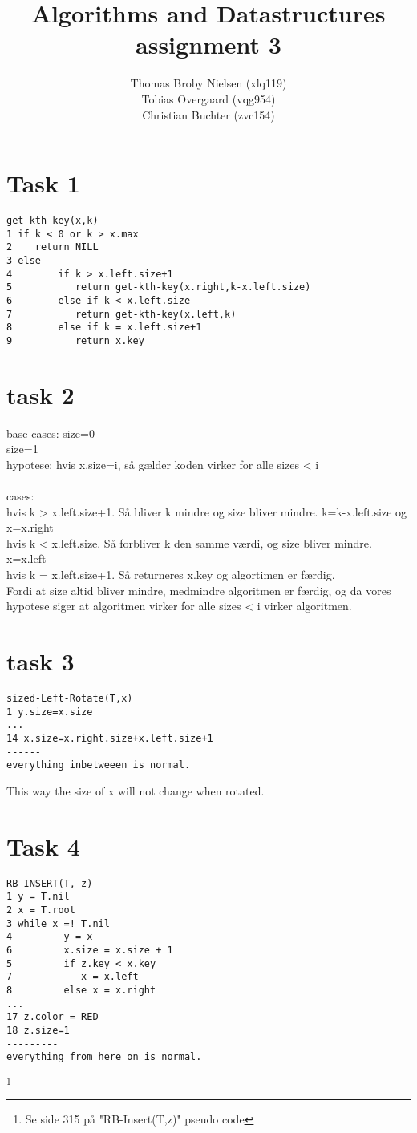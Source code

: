\documentclass[12pt]{article}
\title{Algorithms and Datastructures assignment 3}
\author{Thomas Broby Nielsen (xlq119)\\ Tobias Overgaard (vqg954)\\ Christian Buchter (zvc154)}
\begin{document}
\maketitle

\tableofcontents

\pagebreak
\section*{Task 1}
\begin{verbatim}
get-kth-key(x,k)
1 if k < 0 or k > x.max
2    return NILL
3 else
4        if k > x.left.size+1
5           return get-kth-key(x.right,k-x.left.size)
6        else if k < x.left.size
7           return get-kth-key(x.left,k)
8        else if k = x.left.size+1
9           return x.key
\end{verbatim}

\newpage
\section*{task 2}
base cases:
size=0\\
size=1\\
hypotese: hvis x.size=i, så gælder koden virker for alle sizes < i\\\\
cases:\\
hvis k > x.left.size+1. Så bliver k mindre og size bliver mindre. k=k-x.left.size og x=x.right\\
hvis k < x.left.size. Så forbliver k den samme værdi, og size bliver mindre. x=x.left\\
hvis k = x.left.size+1. Så returneres x.key og algortimen er færdig.\\
Fordi at size altid bliver mindre, medmindre algoritmen er færdig, og da vores hypotese siger at algoritmen virker for alle sizes < i virker algoritmen.
\newpage
\section*{task 3}
\begin{verbatim}
sized-Left-Rotate(T,x)
1 y.size=x.size
...
14 x.size=x.right.size+x.left.size+1
------
everything inbetweeen is normal.

\end{verbatim}
This way the size of x will not change when rotated.
\newpage

\section*{Task 4}
\begin{verbatim}
RB-INSERT(T, z)
1 y = T.nil
2 x = T.root
3 while x =! T.nil
4         y = x
6         x.size = x.size + 1
5         if z.key < x.key
7            x = x.left
8         else x = x.right
...
17 z.color = RED
18 z.size=1
---------
everything from here on is normal.
\end{verbatim}
\footnote{Se side 315 på "RB-Insert(T,z)" pseudo code}
\newpage
\end{document}
